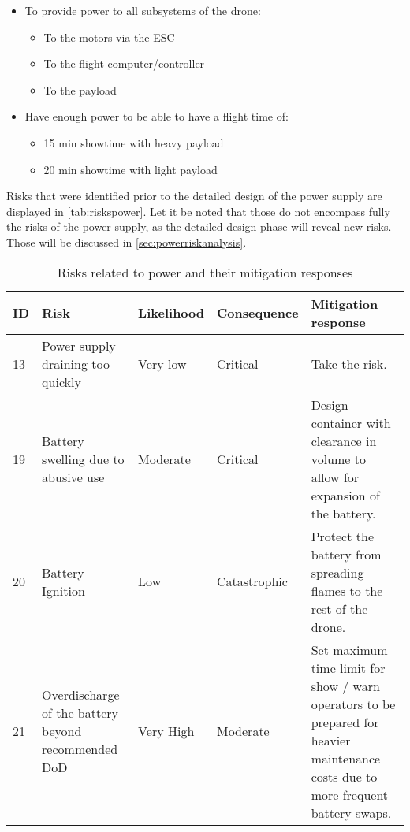 \begin{itemize}[noitemsep,nolistsep]
    \item To provide power to all subsystems of the drone:
    \begin{itemize}[noitemsep,nolistsep]
        \item To the motors via the ESC
        \item To the flight computer/controller
        \item To the payload
    \end{itemize}
    \item Have enough power to be able to have a flight time of:
    \begin{itemize}[noitemsep,nolistsep]
        \item 15 min showtime with heavy payload
        \item 20 min showtime  with light payload
    \end{itemize}
\end{itemize}

Risks that were identified prior to the detailed design of the power supply are displayed in \autoref{tab:riskspower}. Let it be noted that those do not encompass fully the risks of the power supply, as the detailed design phase will reveal new risks. Those will be discussed in \autoref{sec:powerriskanalysis}.

\begin{longtable}[c]{|p{0.65cm}|p{4cm}|p{1.6cm}|p{1.9cm}|p{6cm}|}
\caption{Risks related to power and their mitigation responses}
\label{tab:riskspower}\\
\hline
\textbf{ID} & \textbf{Risk} & \textbf{Likelihood} & \textbf{Consequence} & \textbf{Mitigation response} \\ \hline
\endfirsthead
%
\endhead
%
13 & Power supply draining too quickly & Very low & Critical & Take the risk. \\ \hline
19 & Battery swelling due to abusive use & Moderate & Critical & Design container with clearance in volume to allow for expansion of the battery. \\ \hline
20 & Battery Ignition & Low & Catastrophic & Protect the battery from spreading flames to the rest of the drone. \\ \hline
21 & Overdischarge of the battery beyond recommended DoD & Very High & Moderate & Set maximum time limit for show / warn operators to be prepared for heavier maintenance costs due to more frequent battery swaps. \\ \hline
\end{longtable}

